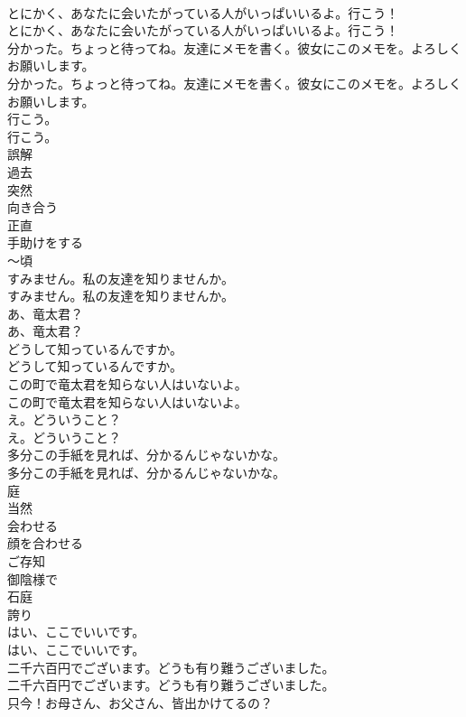 \documentclass[8pt]{extreport}
\begin{document}
\begin{CJK}{UTF8}{min}
\\	とにかく、あなたに会いたがっている人がいっぱいいるよ。行こう！	
\\	とにかく、あなたに会いたがっている人がいっぱいいるよ。行こう！ 
\\	分かった。ちょっと待ってね。友達にメモを書く。彼女にこのメモを。よろしくお願いします。	
\\	分かった。ちょっと待ってね。友達にメモを書く。彼女にこのメモを。よろしくお願いします。 
\\	行こう。	
\\	行こう。 
\\	誤解
\\	過去
\\	突然
\\	向き合う
\\	正直
\\	手助けをする
\\	〜頃
\\	すみません。私の友達を知りませんか。	
\\	すみません。私の友達を知りませんか。 
\\	あ、竜太君？	
\\	あ、竜太君？ 
\\	どうして知っているんですか。	
\\	どうして知っているんですか。 
\\	この町で竜太君を知らない人はいないよ。	
\\	この町で竜太君を知らない人はいないよ。 
\\	え。どういうこと？	
\\	え。どういうこと？ 
\\	多分この手紙を見れば、分かるんじゃないかな。	
\\	多分この手紙を見れば、分かるんじゃないかな。 
\\	庭
\\	当然
\\	会わせる
\\	顔を合わせる
\\	ご存知
\\	御陰様で
\\	石庭
\\	誇り
\\	はい、ここでいいです。	
\\	はい、ここでいいです。 
\\	二千六百円でございます。どうも有り難うございました。	
\\	二千六百円でございます。どうも有り難うございました。 
\\	只今！お母さん、お父さん、皆出かけてるの？	

\end{CJK}
\end{document}
